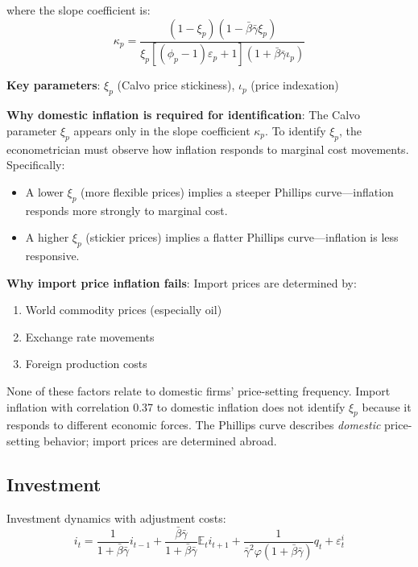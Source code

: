 \documentclass[12pt]{article}
\begin{document}
where the slope coefficient is:
\begin{equation}
\kappa_p = \frac{(1-\xi_p)(1-\bar{\beta}\bar{\gamma}\xi_p)}{\xi_p[(\phi_p-1)\varepsilon_p+1](1+\bar{\beta}\bar{\gamma}\iota_p)}
\label{eq:kappa}
\end{equation}

\textbf{Key parameters}: $\xi_p$ (Calvo price stickiness), $\iota_p$ (price indexation)

\textbf{Why domestic inflation is required for identification}: The Calvo parameter $\xi_p$ appears only in the slope coefficient $\kappa_p$. To identify $\xi_p$, the econometrician must observe how inflation responds to marginal cost movements. Specifically:
\begin{itemize}
    \item A lower $\xi_p$ (more flexible prices) implies a steeper Phillips curve---inflation responds more strongly to marginal cost.
    \item A higher $\xi_p$ (stickier prices) implies a flatter Phillips curve---inflation is less responsive.
\end{itemize}

\textbf{Why import price inflation fails}: Import prices are determined by:
\begin{enumerate}
    \item World commodity prices (especially oil)
    \item Exchange rate movements
    \item Foreign production costs
\end{enumerate}

None of these factors relate to domestic firms' price-setting frequency. Import inflation with correlation 0.37 to domestic inflation does not identify $\xi_p$ because it responds to different economic forces. The Phillips curve describes \textit{domestic} price-setting behavior; import prices are determined abroad.

\subsection{Investment}

Investment dynamics with adjustment costs:
\begin{equation}
\boxed{i_t = \frac{1}{1+\bar{\beta}\bar{\gamma}}i_{t-1} + \frac{\bar{\beta}\bar{\gamma}}{1+\bar{\beta}\bar{\gamma}}\mathbb{E}_t i_{t+1} + \frac{1}{\bar{\gamma}^2\varphi(1+\bar{\beta}\bar{\gamma})}q_t + \varepsilon^i_t}
\label{eq:investment}
\end{equation}
\end{document}
